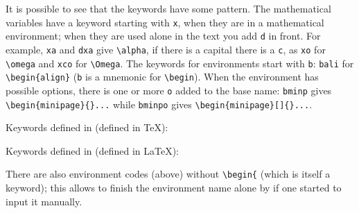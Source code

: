 It is possible to see that the keywords have some pattern. The mathematical variables have a keyword starting with \verb|x|, when they are in a mathematical environment; when they are used alone in the text you add \verb|d| in front. For example, \verb|xa| and \verb|dxa| give \verb|\alpha|, if there is a capital there is a \verb|c|, as  \verb|xo| for \verb|\omega| and \verb|xco| for \verb|\Omega|. The keywords for environments start with \verb|b|: \verb|bali| for \verb|\begin{align}| (\verb|b| is a mnemonic for \verb|\begin|). When the environment has possible options, there is one or more \verb|o| added to the base name: \verb|bminp| gives \verb|\begin{minipage}{}...| while \verb|bminpo| gives \verb|\begin{minipage}[]{}...|.

%
Keywords defined in  (defined in \TeX):
%


Keywords defined in  (defined in \LaTeX):
%


There are also environment codes (above) without \verb|\begin{| (which is itself a keyword); this allows to finish the environment name alone by  if one started to input it manually.

